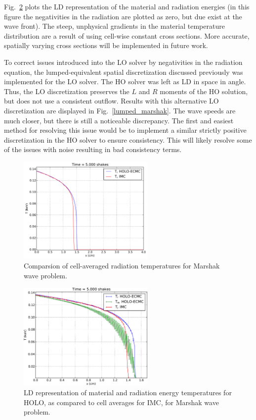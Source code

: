 \documentclass{mc2013}
\begin{document}
Fig.~\ref{blading} plots the LD representation of the material and radiation energies (in this figure the negativities in the radiation are plotted as zero, but due exist at the wave front).  The steep, unphysical gradients in the material temperature distribution are a result of using cell-wise constant cross sections.  More accurate, spatially varying cross sections will be implemented in future work.  

To correct issues introduced into the LO solver by negativities in the radiation equation, the lumped-equivalent spatial discretization discussed previously was implemented for the LO solver.  The HO solver was left as LD in space in angle.  Thus, the LO discretization preserves the $L$ and $R$ moments of the HO solution, but does not use a consistent outflow.  Results with this alternative LO discretization are displayed in Fig.~\ref{lumped_marshak}.  The wave speeds are much closer, but there is still a noticeable discrepancy.   The first and easiest method for resolving this issue would be to implement a similar strictly positive discretization in the HO solver to ensure consistency.  This will likely resolve some of the issues with noise resulting in bad consistency terms.
    \begin{figure}
    \centering
    \includegraphics[width=0.59\textwidth]{marshak_holo_ld.pdf}
    \caption{\label{marshak_holo_ld} Comparsion of cell-averaged radiation temperatures for Marshak wave problem.}
    \end{figure}
    \begin{figure}
        \centering
    \includegraphics[width=0.59\textwidth]{blading.pdf}
        \caption{\label{blading} LD representation of material and radiation energy temperatures for HOLO, as compared to cell averages for IMC, for Marshak wave problem.}
    \end{figure}
\end{document}
